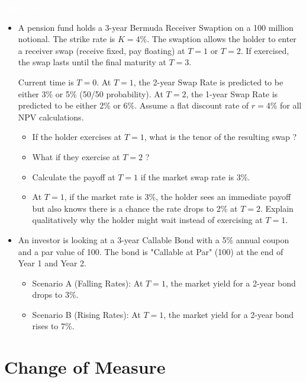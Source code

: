 \documentclass{beamer}
\begin{document}
	\begin{homework}
		\begin{frame}{\textcolor{white}{Homework}}
			\begin{itemize}
				\item[white] A pension fund holds a 3-year Bermuda Receiver Swaption on a 100 million notional. The strike rate is $K=4\%$.
				The swaption allows the holder to enter a receiver swap (receive fixed, pay floating) at $T=1$ or $T=2$. If exercised, the swap lasts until the final maturity at $T=3$.

				Current time is $T=0$. At $T=1$, the 2-year Swap Rate is predicted to be either 3\% or 5\% (50/50 probability). At $T=2$, the 1-year Swap Rate is predicted to be either 2\% or 6\%.
				Assume a flat discount rate of $r=4\%$ for all NPV calculations.

				\begin{itemize}
					\item[white] If the holder exercises at $T=1$, what is the tenor of the resulting swap ?
					\item[white] What if they exercise at $T=2$ ?
					\item[white] Calculate the payoff at $T=1$ if the market swap rate is 3\%.
					\item[white] At $T=1$, if the market rate is 3\%, the holder sees an immediate payoff but also knows there is a chance the rate drops to 2\% at $T=2$. Explain qualitatively why the holder might wait instead of exercising at $T=1$.
				\end{itemize}
				\item[white] An investor is looking at a 3-year Callable Bond with a 5\% annual coupon and a par value of 100. The bond is "Callable at Par" (100) at the end of Year 1 and Year 2.
				\begin{itemize}
					\item[white] Scenario A (Falling Rates): At $T=1$, the market yield for a 2-year bond drops to 3\%.
					\item[white] Scenario B (Rising Rates): At $T=1$, the market yield for a 2-year bond rises to 7\%.
				\end{itemize}

			\end{itemize}
		\end{frame}
	\end{homework}


	\section{Change of Measure}
\end{document}
